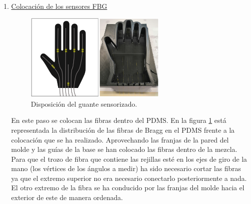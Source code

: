 \begin{itemize}
\begin{enumerate}
		La mezcla de PDMS realiza tiene una relación agente-polímero de 1:10. Se coloca capsula petri sobre la báscula y se vierte en ella desde el vaso de precipitados 55g de elastómero [A]. Una vez se tiene la cantidad necesaria de polímero, se tabula la báscula y se toma el agente de curación desde el bote con ayuda de una pipeta de plástico [B]. Se añade al elastómero 5.5g de agente de curación. Una vez se tienen las cantidades expuestas, se mezclan durante cuatro minutos con la ayuda de la espátula [C]. Después de este paso en algunas ocasiones se generan burbujas de aire, que se pueden eliminar en un horno de vacío en pasos posteriores. En esta ocasión no ha sido necesario. Cuando se tiene una mezcla homogénea (se ha removido durante cuatro minutos correctamente) se vierte el PDMS en el molde del guante [D].  	
		
		
		Conviene recordar que tras este proceso es importante limpiar todas las herramientas utilizadas, siendo el PDMS un compuesto engorroso de limpiar. 
	
		
		\item \underline{Colocación de los sensores FBG}
		
		\begin{figure}[H]
			\centering
			\includegraphics[width=0.65\textwidth]{./img/diagramaMano2}
			\caption{Disposición del guante sensorizado.} \label{fig:manoFBG}
		\end{figure}
		
		En este paso se colocan las fibras dentro del PDMS. En la figura \ref{fig:manoFBG} está representada la distribución de las fibras de Bragg en el PDMS frente a la colocación que se ha realizado. Aprovechando las franjas de la pared del molde y las guías de la base se han colocado las fibras dentro de la mezcla. Para que el trozo de fibra que contiene las rejillas esté en los ejes de giro de la mano (los vértices de los ángulos a medir) ha sido necesario cortar las fibras ya que el extremo superior no era necesario conectarlo posteriormente a nada. El otro extremo de la fibra se ha conducido por las franjas del molde hacia el exterior de este de manera ordenada.
		

\end{enumerate}
\end{itemize}
